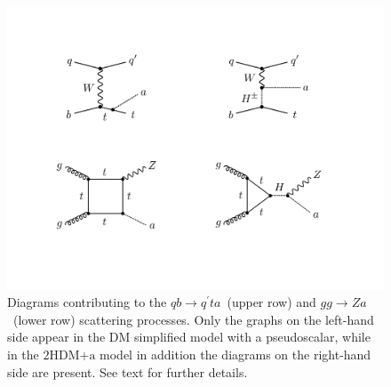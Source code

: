 \documentclass[review]{elsarticle}
\newcommand{\hdma}{\ensuremath{\textrm{2HDM+a}}\xspace}
\begin{document}
\begin{figure}[t!]
\centering
\includegraphics[width=.75\textwidth]{figure2.pdf}
\vspace{6mm}
\caption{\label{fig:diagrams}  Diagrams contributing to the $q b \to q^\prime t a$~(upper row) and $gg \to Za$~(lower row) scattering processes.  Only the graphs on the left-hand side appear in the DM simplified model with a pseudoscalar, while in the \hdma model in addition the diagrams on the right-hand side are present. See text for further details.}
\end{figure}
\end{document}
